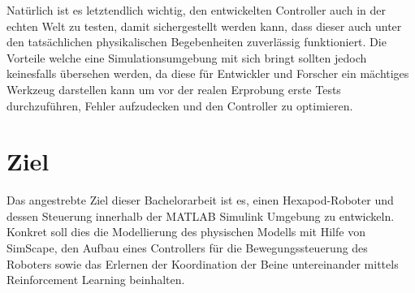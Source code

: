 Natürlich ist es letztendlich wichtig, den entwickelten Controller auch in der echten Welt zu testen, damit sichergestellt werden kann, dass dieser auch unter den tatsächlichen physikalischen Begebenheiten zuverlässig funktioniert.
Die Vorteile welche eine Simulationsumgebung mit sich bringt sollten jedoch keinesfalls übersehen werden, da diese für Entwickler und Forscher ein mächtiges Werkzeug darstellen kann um vor der realen Erprobung erste Tests durchzuführen, Fehler aufzudecken und den Controller zu optimieren.



\section{Ziel}
Das angestrebte Ziel dieser Bachelorarbeit ist es, einen Hexapod-Roboter und dessen Steuerung innerhalb der MATLAB Simulink Umgebung zu entwickeln.
Konkret soll dies die Modellierung des physischen Modells mit Hilfe von SimScape, den Aufbau eines Controllers für die Bewegungssteuerung des Roboters sowie das Erlernen der Koordination der Beine untereinander mittels Reinforcement Learning beinhalten.

